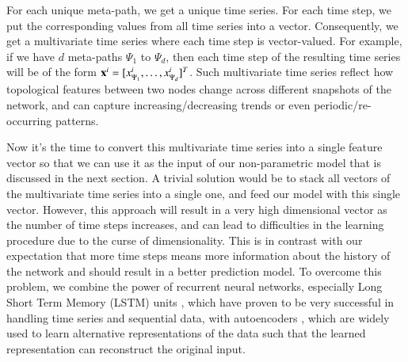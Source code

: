For each unique meta-path, we get a unique time series. For each time step, we put the corresponding values from all time series into a vector. Consequently, we get a multivariate time series where each time step is vector-valued. For example, if we have $d$ meta-paths $\Psi_1$ to $\Psi_d$, then each time step of the resulting time series will be of the form $\mathbf{x}^i=[x_{\Psi_1}^i,\dots,x_{\Psi_d}^i]^T$. Such multivariate time series reflect how topological features between two nodes change across different snapshots of the network, and can capture increasing/decreasing trends or even periodic/re-occurring patterns.

Now it's the time to convert this multivariate time series into a single feature vector so that we can use it as the input of our non-parametric model that is discussed in the next section. A trivial solution would be to stack all vectors of the multivariate time series into a single one, and feed our model with this single vector. However, this approach will result in a very high dimensional vector as the number of time steps increases, and can lead to difficulties in the learning procedure due to the curse of dimensionality. This is in contrast with our expectation that more time steps means more information about the history of the network and should result in a better prediction model. To overcome this problem, we combine the power of recurrent neural networks, especially Long Short Term Memory (LSTM) units \cite{hochreiter1997long}, which have proven to be very successful in handling time series and sequential data, with autoencoders \cite{bengio2009learning}, which are widely used to learn alternative representations of the data such that the learned representation can reconstruct the original input.


